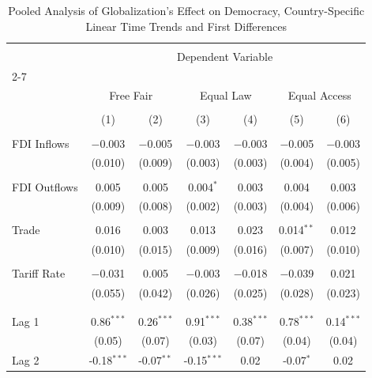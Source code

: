 
\begin{table}[!htbp] \centering 
  \caption{Pooled Analysis of Globalization's Effect on Democracy, Country-Specific Linear Time Trends and First Differences} 
  \label{} 
\small 
\begin{tabular}{@{\extracolsep{2pt}}lcccccc} 
\\[-1.8ex]\hline 
\hline \\[-1.8ex] 
 & \multicolumn{6}{c}{Dependent Variable} \\ 
\cline{2-7} 
\\[-1.8ex] & \multicolumn{2}{c}{Free Fair} & \multicolumn{2}{c}{Equal Law} & \multicolumn{2}{c}{Equal Access} \\ 
\\[-1.8ex] & (1) & (2) & (3) & (4) & (5) & (6)\\ 
\hline \\[-1.8ex] 
 FDI Inflows & $-$0.003 & $-$0.005 & $-$0.003 & $-$0.003 & $-$0.005 & $-$0.003 \\ 
  & (0.010) & (0.009) & (0.003) & (0.003) & (0.004) & (0.005) \\ 
  & & & & & & \\ 
 FDI Outflows & 0.005 & 0.005 & 0.004$^{*}$ & 0.003 & 0.004 & 0.003 \\ 
  & (0.009) & (0.008) & (0.002) & (0.003) & (0.004) & (0.006) \\ 
  & & & & & & \\ 
 Trade & 0.016 & 0.003 & 0.013 & 0.023 & 0.014$^{**}$ & 0.012 \\ 
  & (0.010) & (0.015) & (0.009) & (0.016) & (0.007) & (0.010) \\ 
  & & & & & & \\ 
 Tariff Rate & $-$0.031 & 0.005 & $-$0.003 & $-$0.018 & $-$0.039 & 0.021 \\ 
  & (0.055) & (0.042) & (0.026) & (0.025) & (0.028) & (0.023) \\ 
  & & & & & & \\ 
\hline \\[-1.8ex] 
Lag 1 & 0.86$^{***}$ & 0.26$^{***}$ & 0.91$^{***}$ & 0.38$^{***}$ & 0.78$^{***}$ & 0.14$^{***}$ \\ 
 & (0.05) & (0.07) & (0.03) & (0.07) & (0.04) & (0.04) \\ 
Lag 2 & -0.18$^{***}$ & -0.07$^{**}$ & -0.15$^{***}$ & 0.02 & -0.07$^{*}$ & 0.02 \\ 

\end{tabular}
\end{table}
